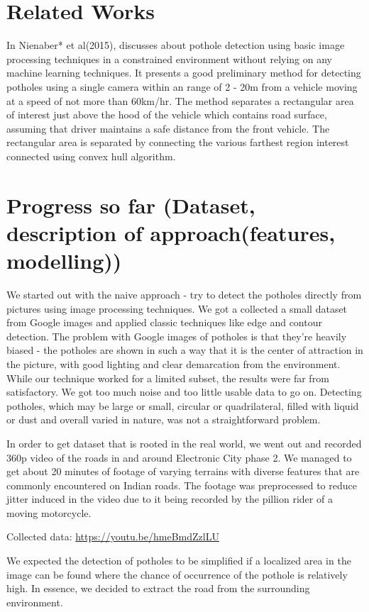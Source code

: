 \documentclass[12pt,a4paper]{article}
\begin{document}
\section{Related Works}
In Nienaber* et al(2015), discusses about pothole detection using basic image processing techniques in a constrained environment without relying on any machine learning techniques. It presents a good preliminary method for detecting potholes using a single camera within an range of 2 - 20m from a vehicle moving at a speed of not more than 60km/hr. The method separates a rectangular area of interest just above the hood of the vehicle which contains road surface, assuming that driver maintains a safe distance from the front vehicle. The rectangular area is separated by connecting the various farthest region interest connected using convex hull algorithm.


\section{Progress so far (Dataset, description of approach(features, modelling))}
We started out with the naive approach - try to detect the potholes directly from pictures using image processing techniques. We got a collected a small dataset from Google images and applied classic techniques like edge and contour detection. The problem with Google images of potholes is that they're heavily biased - the potholes are shown in such a way that it is the center of attraction in the picture, with good lighting and clear demarcation from the environment. While our technique worked for a limited subset, the results were far from satisfactory. We got too much noise and too little usable data to go on. Detecting potholes, which may be large or small, circular or quadrilateral, filled with liquid or dust and overall varied in nature, was not a straightforward problem.

In order to get dataset that is rooted in the real world, we went out and recorded 360p video of the roads in and around Electronic City phase 2. We managed to get about 20 minutes of footage of varying terrains with diverse features that are commonly encountered on Indian roads. The footage was preprocessed to reduce jitter induced in the video due to it being recorded by the pillion rider of a moving motorcycle. 

Collected data: \url{ https://youtu.be/hmeBmdZzlLU }

We expected the detection of potholes to be simplified if a localized area in the image can be found where the chance of occurrence of the pothole is relatively high. In essence, we decided to extract the road from the surrounding environment.
\end{document}

